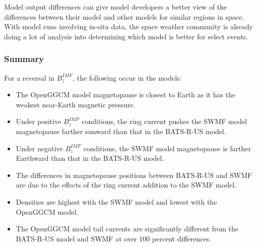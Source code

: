 Model output differences can give model developers a better view of
the differences between their model and other models for similar regions in
space. With model runs involving in-situ data, the space weather community is
already doing a lot of analysis into determining which model is better for
select events.

\subsubsection{Summary}
For a reversal in $B_z^{IMF}$, the
following occur in the models:
\begin{itemize}
  \item The OpenGGCM model magnetopause is closest to Earth as it has the weakest
  near-Earth magnetic pressure.
  \item Under positive $B_z^{IMF}$ conditions, the ring current pushes the SWMF
  model magnetopause farther sunward than that in the BATS-R-US model.
  \item Under negative $B_z^{IMF}$ conditions, the SWMF model magnetopause is
  farther Earthward than that in the BATS-R-US model.
  \item The differences in magnetopause positions between BATS-R-US and SWMF
  are due to the effects of the ring current addition to the SWMF model.
  \item Densities are highest with the SWMF model and lowest with the OpenGGCM
  model.
  \item The OpenGGCM model tail currents are significantly different from the
  BATS-R-US model and SWMF at over 100 percent differences.
\end{itemize}

